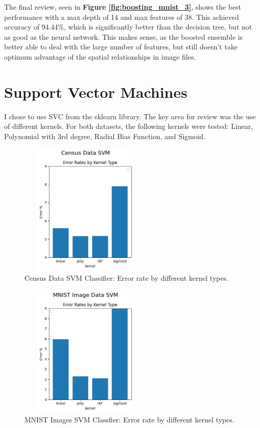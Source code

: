 \documentclass[letterpaper]{article} %
\begin{document}
The final review, seen in \textbf{Figure \ref{fig:boosting_mnist_3}}, shows the best performance with a max depth of 14 and max features of 38.  This achieved accuracy of 94.44\%, which is significantly better than the decision tree, but not as good as the neural network.  This makes sense, as the boosted ensemble is better able to deal with the large number of features, but still doesn't take optimum advantage of the spatial relationships in image files.


\section{Support Vector Machines}

I chose to use SVC from the sklearn library.  The key area for review was the use of different kernels.  For both datasets, the following kernels were tested: Linear, Polynomial with 3rd degree, Radial Bias Function, and Sigmoid.

\begin{figure}[h]
\centering
\includegraphics[width=2.5in, height=2.5in]{figures/Census_Data_SVM_svm_1.png}
\caption{Census Data SVM Classifier:  Error rate by different kernel types.  }
\label{fig:svm_census_1}
\end{figure}

\begin{figure}[h]
\centering
\includegraphics[width=2.5in, height=2.5in]{figures/MNIST_Image_Data_SVM_svm_1.png}
\caption{MNIST Images SVM Classfier:  Error rate by different kernel types.  }
\label{fig:svm_mnist_1}
\end{figure}
\end{document}
